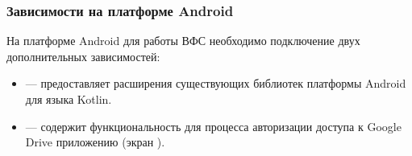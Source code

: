   \subsubsection{Зависимости на платформе Android}
    На платформе Android для работы ВФС  необходимо подключение двух дополнительных зависимостей:
    \begin{itemize}
      \item {}\cite{android-ktx-dep} --- предоставляет расширения существующих библиотек платформы Android для языка Kotlin.
      \item {}\cite{play-services-auth-dep} --- содержит функциональность для процесса авторизации доступа к Google Drive приложению (экран ).
    \end{itemize}

